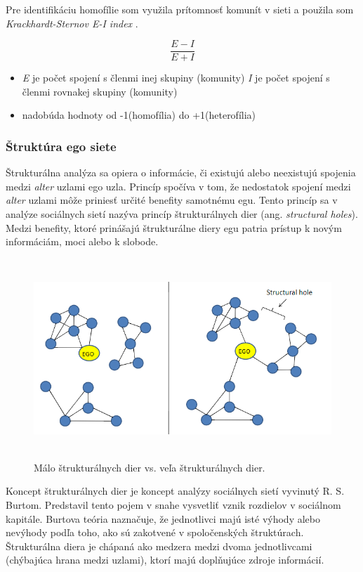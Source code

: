 \documentclass[slovak,master,public,dept460,male,cpdeclaration,oneside]{diploma}
\begin{document}
Pre identifikáciu homofílie som využila prítomnosť komunít v sieti a použila som \textit{Krackhardt-Sternov E-I index}  \cite{22}.

\begin{equation}
{
\frac{E-I}{E+I}
}
\label{equation_eiindex}
\end{equation}


\begin{itemize}
\item \textit{E} je počet spojení s členmi inej skupiny (komunity) \textit{I} je počet spojení s členmi rovnakej skupiny (komunity)
\item nadobúda hodnoty od -1(homofília) do +1(heterofília)
\end{itemize}



\subsubsection{Štruktúra ego siete}
Štrukturálna analýza sa opiera o informácie, či existujú alebo neexistujú spojenia medzi \textit{alter} uzlami ego uzla. Princíp spočíva v tom, že nedostatok spojení medzi \textit{alter} uzlami môže priniesť určité benefity samotnému egu. Tento princíp sa v analýze sociálnych sietí nazýva princíp štrukturálnych dier (ang. \textit{structural holes}). Medzi benefity, ktoré prinášajú štrukturálne diery egu patria prístup k novým informáciám, moci alebo k slobode.


\begin{figure}[H]
\centering
\includegraphics[width=15cm, height=7.5cm]{figures/structuralholes}
\caption{Málo štrukturálnych dier vs. veľa štrukturálnych dier.}
\end{figure}


Koncept štrukturálnych dier je koncept analýzy sociálnych sietí vyvinutý R. S. Burtom. Predstavil tento pojem v snahe vysvetliť vznik rozdielov v sociálnom kapitále. Burtova teória naznačuje, že jednotlivci majú isté výhody alebo nevýhody podľa toho, ako sú zakotvené v spoločenských štruktúrach. Štrukturálna diera je chápaná ako medzera medzi dvoma jednotlivcami (chýbajúca hrana medzi uzlami), ktorí majú doplňujúce zdroje informácií. \cite{burt2004structural}
\bigskip
\end{document}

